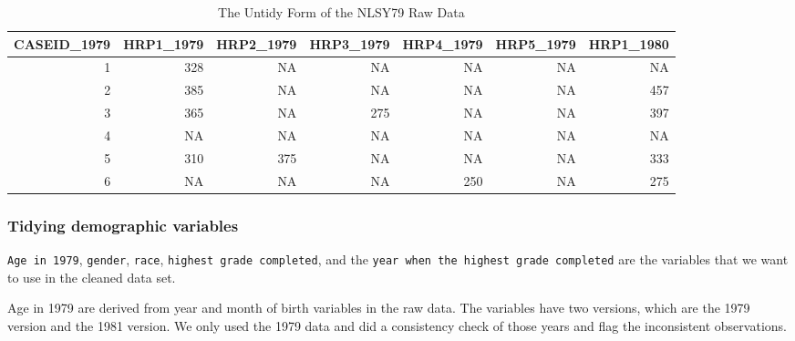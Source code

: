 \documentclass{article}
\begin{document}
\begin{table}

\caption{\label{tab:untidy-data}The Untidy Form of the NLSY79 Raw Data}
\centering
\begin{tabular}[t]{r|r|r|r|r|r|r}
\hline
CASEID\_1979 & HRP1\_1979 & HRP2\_1979 & HRP3\_1979 & HRP4\_1979 & HRP5\_1979 & HRP1\_1980\\
\hline
1 & 328 & NA & NA & NA & NA & NA\\
\hline
2 & 385 & NA & NA & NA & NA & 457\\
\hline
3 & 365 & NA & 275 & NA & NA & 397\\
\hline
4 & NA & NA & NA & NA & NA & NA\\
\hline
5 & 310 & 375 & NA & NA & NA & 333\\
\hline
6 & NA & NA & NA & 250 & NA & 275\\
\hline
\end{tabular}
\end{table}

\hypertarget{tidying-demographic-variables}{%
\subsubsection{Tidying demographic variables}\label{tidying-demographic-variables}}

\texttt{Age\ in\ 1979}, \texttt{gender}, \texttt{race}, \texttt{highest\ grade\ completed}, and the \texttt{year\ when\ the\ highest\ grade\ completed} are the variables that we want to use in the cleaned data set.

Age in 1979 are derived from year and month of birth variables in the raw data. The variables have two versions, which are the 1979 version and the 1981 version. We only used the 1979 data and did a consistency check of those years and flag the inconsistent observations.
\end{document}
